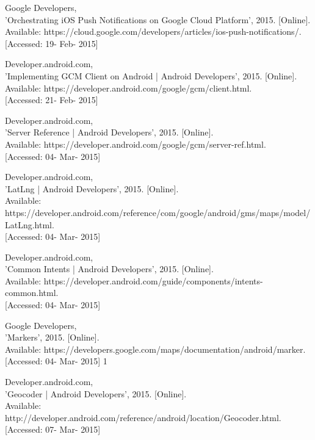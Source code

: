 \documentclass[]{article}
\begin{document}
\begin{enumerate}[label={[\arabic*]}]
\item Google Developers, \\{}'Orchestrating iOS Push Notifications on Google Cloud Platform', 2015. [Online].\\{} Available: https://cloud.google.com/developers/articles/ios-push-notifications/. \\{}[Accessed: 19- Feb- 2015]

\item  Developer.android.com, \\{}'Implementing GCM Client on Android | Android Developers', 2015. [Online].\\{} Available: https://developer.android.com/google/gcm/client.html. \\{}[Accessed: 21- Feb- 2015]

\item  Developer.android.com,\\{} 'Server Reference | Android Developers', 2015. [Online].\\{} Available: https://developer.android.com/google/gcm/server-ref.html.\\{} [Accessed: 04- Mar- 2015]

\item  Developer.android.com,\\{} 'LatLng | Android Developers', 2015. [Online].\\{} Available: https://developer.android.com/reference/com/google/android/gms/maps/model/LatLng.html. \\{}[Accessed: 04- Mar- 2015]

\item  Developer.android.com, \\{}'Common Intents | Android Developers', 2015. [Online].\\{} Available: https://developer.android.com/guide/components/intents-common.html.\\{} [Accessed: 04- Mar- 2015]

\item  Google Developers, \\{}'Markers', 2015. [Online].\\{} Available: https://developers.google.com/maps/documentation/android/marker. \\{}[Accessed: 04- Mar- 2015]
1
\item  Developer.android.com, \\{}'Geocoder | Android Developers', 2015. [Online].\\{} Available: http://developer.android.com/reference/android/location/Geocoder.html. \\{}[Accessed: 07- Mar- 2015]


\end{enumerate}
\end{document}
